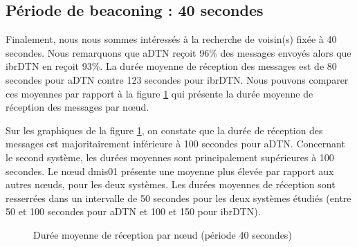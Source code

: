 \documentclass[a4paper,10pt]{article}
\begin{document}
\subsection {Période de beaconing : 40 secondes}

Finalement, nous nous sommes intéressés à la recherche de voisin(s) fixée à 40 secondes. Nous remarquons que aDTN reçoit 96\% des messages envoyés alors que ibrDTN en reçoit 93\%. La durée moyenne de réception des messages est de 80 secondes pour aDTN contre 123 secondes pour ibrDTN. Nous pouvons comparer ces moyennes par rapport à la figure \ref{fig:40_avg_rcv_duration} qui présente la durée moyenne de réception des messages par nœud.\par

Sur les graphiques de la figure \ref{fig:40_avg_rcv_duration}, on constate que la durée de réception des messages est majoritairement inférieure à 100 secondes pour aDTN. Concernant le second système, les durées moyennes sont principalement supérieures à 100 secondes. Le nœud dmis01 présente une moyenne plus élevée par rapport aux autres nœuds, pour les deux systèmes. Les durées moyennes de réception sont resserrées dans un intervalle de 50 secondes pour les deux systèmes étudiés (entre 50 et 100 secondes pour aDTN et 100 et 150 pour ibrDTN). \par

\begin{figure}[h!]
    \centering
    \caption{Durée moyenne de réception par nœud (période 40 secondes)}
    \label{fig:40_avg_rcv_duration}
\end{figure}
	
\end{document}
